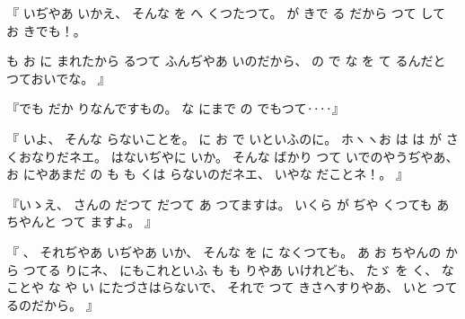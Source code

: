 %
『
いぢやあ
いかえ、
%
そんな
を
へ
くつたつて。
%
が
きで
る
だから
つて
して
お
きでも！。

%
も
お
に
まれたから
るつて
ふんぢやあ
いのだから、
%
の
で
な
を
て
るんだと
つておいでな。
』

%
『でも
だか
りなんですもの。
%
な
にまで
の
でもつて‥‥』%

%
『
いよ、
%
そんな
らないことを。
%
に
お
で
いといふのに。
%
ホヽヽお
は
は
が
さくおなりだネエ。
%
はないぢやに
いか。
%
そんな
ばかり
つて
いでのやうぢやあ、
%
お
にやあまだ
の
も
も
くは
らないのだネエ、
%
いやな
だことネ！。
』

%
『いゝえ、
%
さんの
だつて
だつて
あ
つてますは。
%
いくら
が
ぢや
くつても
あちやんと
つて
ますよ。
』

%
『
、
%
それぢやあ
いぢやあ
いか、
%
そんな
を
に
なくつても。
%
あ
お
ちやんの
から
つてる
りにネ、
%
にもこれといふ
も
も
りやあ
いけれども、
%
たゞ
を
く、
%
なことや
な
や
い
にたづさはらないで、
%
それで
つて%
きさへすりやあ、
%
いと
つてるのだから。
』

